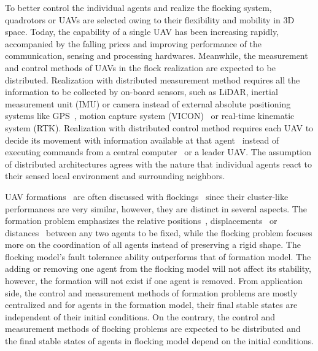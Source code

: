 To better control the individual agents and realize the flocking system, quadrotors or UAVs are selected owing to their flexibility and mobility in 3D space. Today, the capability of a single UAV has been increasing rapidly, accompanied by the falling prices and improving performance of the communication, sensing and processing hardwares. Meanwhile, the measurement and control methods of UAVs in the flock realization are expected to be distributed. Realization with distributed measurement method requires all the information to be collected by on-board sensors, such as LiDAR, inertial measurement unit (IMU) or camera instead of external absolute positioning systems like GPS~\cite{Vicsek2018}, motion capture system (VICON)~\cite{Swarm2018,MPC} or real-time kinematic system (RTK). Realization with distributed control method requires each UAV to decide its movement with information available at that agent~\cite{MAV2017} instead of executing commands from a central computer~\cite{CAPT,POMDP,Kumar2018} or a leader UAV. The assumption of distributed architectures agrees with the nature that individual agents react to their sensed local environment and surrounding neighbors.

UAV formations~\cite{Virtual2008,LQR2014,VirtualLeader,Askari2015,Bearing2016,RAS} are often discussed with flockings~\cite{Zhang2018,Martin2014,Vicsek2018,VLAP,Behavior2004} since their cluster-like performances are very similar, however, they are distinct in several aspects. The formation problem emphasizes the relative positions~\cite{Virtual2008,LQR2014,VirtualLeader}, displacements~\cite{Askari2015,Bearing2016} or distances~\cite{RAS} between any two agents to be fixed, while the flocking problem focuses more on the coordination of all agents instead of preserving a rigid shape. The flocking model's fault tolerance ability outperforms that of formation model. The adding or removing one agent from the flocking model will not affect its stability, however, the formation will not exist if one agent is removed. From application side, the control and measurement methods of formation problems are mostly centralized and for agents in the formation model, their final stable states are independent of their initial conditions. On the contrary, the control and measurement methods of flocking problems are expected to be distributed and the final stable states of agents in flocking model depend on the initial conditions.

